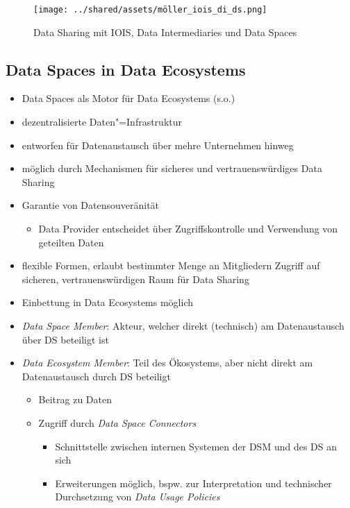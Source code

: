 \begin{figure}
    \texttt{[image: ../shared/assets/möller\_iois\_di\_ds.png]}
    \caption{Data Sharing mit IOIS, Data Intermediaries und Data Spaces~\cite{mollerIndustrialDataEcosystems2024}}
\end{figure}


\subsection{Data Spaces in Data Ecosystems}

\begin{itemize}
    \item Data Spaces als Motor für Data Ecosystems (s.o.)
    \item dezentralisierte Daten"=Infrastruktur
    \item entworfen für Datenaustausch über mehre Unternehmen hinweg
    \item möglich durch Mechanismen für sicheres und vertrauenswürdiges Data Sharing
    \item Garantie von Datensouveränität
    \begin{itemize}
        \item Data Provider entscheidet über Zugriffskontrolle und Verwendung von geteilten Daten
    \end{itemize}
    \item flexible Formen, erlaubt bestimmter Menge an Mitgliedern Zugriff auf sicheren, vertrauenswürdigen Raum für Data Sharing
    \item Einbettung in Data Ecosystems möglich~\cite{mollerIndustrialDataEcosystems2024}
\end{itemize}

\vspace{1cm}

\begin{itemize}
    \item \emph{Data Space Member}: Akteur, welcher direkt (technisch) am Datenaustausch über DS beteiligt ist
    \item \emph{Data Ecosystem Member}: Teil des Ökosystems, aber nicht direkt am Datenaustausch durch DS beteiligt
    \begin{itemize}
        \item Beitrag zu Daten
        \item Zugriff durch \emph{Data Space Connectors}
        \begin{itemize}
            \item Schnittstelle zwischen internen Systemen der DSM und des DS an sich
            \item Erweiterungen möglich, bspw. zur Interpretation und technischer Durchsetzung von \emph{Data Usage Policies}~\cite{mollerIndustrialDataEcosystems2024}
        \end{itemize}
    \end{itemize}
\end{itemize}

